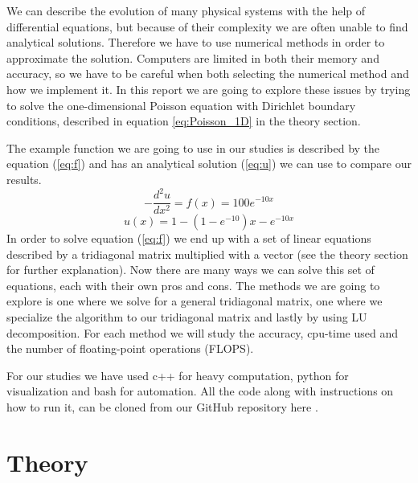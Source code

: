 \documentclass[reprint, english,notitlepage]{revtex4-1}  %
\begin{document}
We can describe the evolution of many physical systems with the help of differential equations, but because of their complexity we are often unable to find analytical solutions. Therefore we have to use numerical methods in order to approximate the solution. Computers are limited in both their memory and accuracy, so we have to be careful when both selecting the numerical method and how we implement it. In this report we are going to explore these issues by trying to solve the one-dimensional Poisson equation with Dirichlet boundary conditions, described in equation \ref{eq:Poisson_1D} in the theory section.

The example function we are going to use in our studies is described by the equation (\ref{eq:f}) and has an analytical solution (\ref{eq:u}) we can use to compare our results.
\begin{equation}
	-\frac{d^2u}{dx^2} = f(x) = 100e^{-10x}
	\label{eq:f}
\end{equation}
\begin{equation}
	u(x) = 1 - (1 - e^{-10})x - e^{-10x}
	\label{eq:u}
\end{equation}
In order to solve equation (\ref{eq:f}) we end up with a set of linear equations described by a tridiagonal matrix multiplied with a vector (see the theory section for further explanation). Now there are many ways we can solve this set of equations, each with their own pros and cons. The methods we are going to explore is one where we solve for a general tridiagonal matrix, one where we specialize the algorithm to our tridiagonal matrix and lastly by using LU decomposition. For each method we will study the accuracy, cpu-time used and the number of floating-point operations (FLOPS).

For our studies we have used c++ for heavy computation, python for visualization and bash for automation. All the code along with instructions on how to run it, can be cloned from our GitHub repository here \citep{github}.



\section{Theory}
\end{document}
